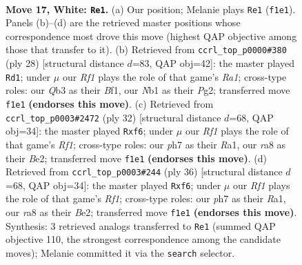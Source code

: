 \documentclass[11pt]{article}
\begin{document}
\clearpage

\begin{figure}[p]\centering
\begin{subfigure}{0.46\textwidth}\centering
\resizebox{\linewidth}{!}{%
\newchessgame
\chessboard[
  setfen={r1b1kb1r/2q2ppp/1p6/p3n3/3p3P/1Q3N2/PP3PP1/RNB2RK1 w q - 0 17},
  showmover=false,
  pgfstyle=straightmove, color=movearrow, markmove={f1-e1}
]}
\caption{}
\end{subfigure}\hfill
\begin{subfigure}{0.46\textwidth}\centering
\resizebox{\linewidth}{!}{%
\newchessgame
\chessboard[
  setfen={rn3rk1/1p1b1p2/5p1p/p2qp3/8/P1Q1PN2/1P3PPP/R3KB1R w KQ - 0 15},
  showmover=false,
  pgfstyle=straightmove, color=movearrow, markmove={a1-d1}
]}
\caption{}
\end{subfigure}
\\[4pt]
\begin{subfigure}{0.46\textwidth}\centering
\resizebox{\linewidth}{!}{%
\newchessgame
\chessboard[
  setfen={r1b2r1k/1p3ppp/p4n2/2q1p3/P3P3/2N3Q1/1PP1B1PP/R4R1K w - - 2 17},
  showmover=false,
  pgfstyle=straightmove, color=movearrow, markmove={f1-f6}
]}
\caption{}
\end{subfigure}\hfill
\begin{subfigure}{0.46\textwidth}\centering
\resizebox{\linewidth}{!}{%
\newchessgame
\chessboard[
  setfen={r1b2r1k/1p3ppp/p4n2/2q1p3/P3P3/2N3Q1/1PP1B1PP/R4R1K w - - 2 19},
  showmover=false,
  pgfstyle=straightmove, color=movearrow, markmove={f1-f6}
]}
\caption{}
\end{subfigure}
\caption{\textbf{Move 17, White: \texttt{Re1}.} (a) Our position; Melanie plays \texttt{Re1} (\texttt{f1e1}). Panels (b)--(d) are the retrieved master positions whose correspondence most drove this move (highest QAP objective among those that transfer to it). (b) Retrieved from \texttt{ccrl\_top\_p0000\#380} (ply 28) [structural distance $d$=83, QAP obj=42]: the master played \texttt{Rd1}; under $\mu$ our \emph{Rf1} plays the role of that game's \emph{Ra1}; cross-type roles: our \emph{Q}b3 as their \emph{B}f1, our \emph{N}b1 as their \emph{P}g2; transferred move \texttt{f1e1} \textbf{(endorses this move)}. (c) Retrieved from \texttt{ccrl\_top\_p0003\#2472} (ply 32) [structural distance $d$=68, QAP obj=34]: the master played \texttt{Rxf6}; under $\mu$ our \emph{Rf1} plays the role of that game's \emph{Rf1}; cross-type roles: our \emph{p}h7 as their \emph{R}a1, our \emph{r}a8 as their \emph{B}e2; transferred move \texttt{f1e1} \textbf{(endorses this move)}. (d) Retrieved from \texttt{ccrl\_top\_p0003\#244} (ply 36) [structural distance $d$=68, QAP obj=34]: the master played \texttt{Rxf6}; under $\mu$ our \emph{Rf1} plays the role of that game's \emph{Rf1}; cross-type roles: our \emph{p}h7 as their \emph{R}a1, our \emph{r}a8 as their \emph{B}e2; transferred move \texttt{f1e1} \textbf{(endorses this move)}. Synthesis: 3 retrieved analogs transferred to \texttt{Re1} (summed QAP objective 110, the strongest correspondence among the candidate moves); Melanie committed it via the \texttt{search} selector.}
\label{fig:thought-m32}
\end{figure}
\end{document}
